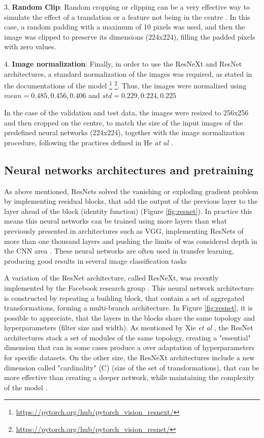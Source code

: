 \documentclass[10pt,onecolumn,titlepage,letterpaper]{article}
\begin{document}
3. \textbf{Random Clip}: Random cropping or clipping can be a very effective way to simulate the effect of a translation or a feature not being in the centre \cite{Shorten2019}. In this case, a random padding with a maximum of 10 pixels was used, and then the image was clipped to preserve its dimensions (224x224), filling the padded pixels with zero values.

4. \textbf{Image normalization}: Finally, in order to use the ResNeXt and ResNet architectures, a standard normalization  of the images was required, as stated in the documentations of the model \footnote{\url{https://pytorch.org/hub/pytorch_vision_resnext/}} \footnote{\url{https://pytorch.org/hub/pytorch_vision_resnet/}}. Thus, the images were normalized using $mean = {0.485, 0.456, 0.406}$ and $std = {0.229, 0.224, 0.225}$ 

In the case of the validation and test data, the images were resized to 256x256 and then cropped on the centre, to match the size of the input images of the predefined neural networks (224x224), together with the image normalization procedure, following the practices defined in He \textit{at al}  \cite{He2016}.

\subsection{Neural networks architectures and pretraining}

As above mentioned, ResNets solved the vanishing or exploding gradient problem by implementing residual blocks, that add the output of the previous layer to the layer ahead of the block (identity function) (Figure \ref{fig:resnet}). In practice this means this neural networks can be trained using more layers than what previously presented in architectures such as VGG, implementing ResNets of more than one thousand layers and pushing the limits of was considered depth in the CNN area \cite{He2016,He2016a}. These neural networks are often used in transfer learning, producing good results in several image classification tasks \cite{Huh2016}

A variation of the ResNet architecture, called ResNeXt, was recently implemented by the Facebook research group \cite{Xie2017}. This neural network architecture is constructed by repeating a building block, that contain a set of aggregated transformations, forming a multi-branch architecture. In Figure \ref{fig:resnet}, it is possible to appreciate, that the layers in the blocks share the same topology and hyperparameters (filter size and width). As mentioned by Xie \textit{et al} \cite{Xie2017}, the ResNet architectures stack a set of modules of the same topology, creating a "essential" dimension that can in some cases produce a over adaptation of hyperparameters for specific datasets. On the other size, the ResNeXt architectures include a new dimension called "cardinality" (C) (size of the set of transformations), that can be more effective than creating a deeper network, while maintaining the complexity of the model \cite{Xie2017}.
\end{document}
